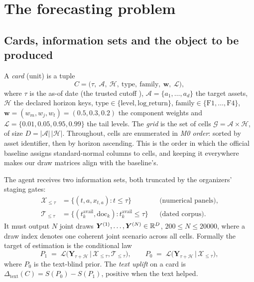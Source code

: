 \section{The forecasting problem}\label{sec:problem}

\subsection{Cards, information sets and the object to be produced}

A \emph{card} (unit) is a tuple
\begin{equation}
  C = \bigl(\tau,\ \mathcal{A},\ \mathcal{H},\ \text{type},\ \text{family},\ \bm w,\ \mathcal{L}\bigr),
\end{equation}
where $\tau$ is the as-of date (the trusted cutoff ), $\mathcal{A}=\{a_1,\dots,a_d\}$ the target
assets, $\mathcal{H}$ the declared horizon keys, $\text{type}\in\{\text{level},\text{log\_return}\}$, $\text{family}\in\{\text{F1},\dots,\text{F4}\}$,
$\bm w=(w_m,w_j,w_t)=(0.5,0.3,0.2)$ the component weights and $\mathcal{L}=\{0.01,0.05,0.95,0.99\}$ the tail levels.
The \emph{grid} is the set of cells $\mathcal{G}=\mathcal{A}\times\mathcal{H}$, of size $D=|\mathcal{A}|\,|\mathcal{H}|$. Throughout, cells
are enumerated in \emph{M0 order}: sorted by asset identifier, then by horizon ascending. This is the order in which the official
baseline assigns standard-normal columns to cells, and keeping it everywhere makes our draw matrices align with the baseline's.

The agent receives two information sets, both truncated by the organizers' staging gates:
\begin{align}
  \mathcal{X}_{\le\tau} &= \{(t,a,x_{t,a}) : t\le\tau\} &&\text{(numerical panels)},\\
  \mathcal{T}_{\le\tau} &= \{(t^{\mathrm{avail}}_k, \text{doc}_k) : t^{\mathrm{avail}}_k \le \tau\} &&\text{(dated corpus)}.
\end{align}
It must output $N$ joint draws $\bm Y^{(1)},\dots,\bm Y^{(N)}\in\mathbb{R}^D$, $200\le N\le 20000$, where a draw index denotes one coherent
joint scenario across all cells. Formally the target of estimation is the conditional law
\begin{equation}\label{eq:target}
  P_1 \;=\; \mathcal{L}\bigl(\bm Y_{\tau+\mathcal{H}} \,\big|\, \mathcal{X}_{\le\tau},\mathcal{T}_{\le\tau}\bigr),
  \qquad
  P_0 \;=\; \mathcal{L}\bigl(\bm Y_{\tau+\mathcal{H}} \,\big|\, \mathcal{X}_{\le\tau}\bigr),
\end{equation}
where $P_0$ is the text-blind prior. The \emph{text uplift} on a card is $\Delta_{\mathrm{text}}(C)=S(P_0)-S(P_1)$, positive when the text
helped.


